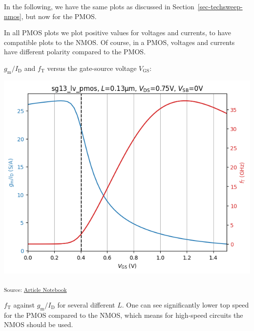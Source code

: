 \documentclass[
  a4paper,
  DIV=11,
  numbers=noendperiod]{scrartcl}
\begin{document}
In the following, we have the same plots as discussed in
Section~\ref{sec-techsweep-nmos}, but now for the PMOS.

\begin{tcolorbox}[enhanced jigsaw, colframe=quarto-callout-note-color-frame, opacityback=0, breakable, toptitle=1mm, left=2mm, rightrule=.15mm, titlerule=0mm, arc=.35mm, toprule=.15mm, bottomrule=.15mm, colbacktitle=quarto-callout-note-color!10!white, bottomtitle=1mm, colback=white, title=\textcolor{quarto-callout-note-color}{\faInfo}\hspace{0.5em}{Note}, coltitle=black, leftrule=.75mm, opacitybacktitle=0.6]

In all PMOS plots we plot positive values for voltages and currents, to
have compatible plots to the NMOS. Of course, in a PMOS, voltages and
currents have different polarity compared to the PMOS.

\end{tcolorbox}

\(g_\mathrm{m}/I_\mathrm{D}\) and \(f_\mathrm{T}\) versus the
gate-source voltage \(V_\mathrm{GS}\):

\includegraphics{index_files/figure-latex/.-sizing-techsweep_sg13_plots_pmos-cell-6-output-1.png}

\textsubscript{Source:
\href{https://iic-jku.github.io/analog-circuit-design/index.qmd.html}{Article
Notebook}}

\(f_\mathrm{T}\) against \(g_\mathrm{m}/I_\mathrm{D}\) for several
different \(L\). One can see significantly lower top speed for the PMOS
compared to the NMOS, which means for high-speed circuits the NMOS
should be used.
\end{document}
